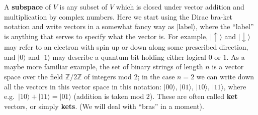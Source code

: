 \documentclass[fleqn]{article}
\begin{document}
A \textbf{subspace} of \(V\) is any subset of \(V\) which is closed under vector addition and multiplication by complex numbers.
Here we start using the Dirac bra-ket notation and write vectors in a somewhat fancy way as \(|\text{label}\rangle\), where the ``label'' is anything that serves to specify what the vector is.
For example, \(|\uparrow\rangle\) and \(|\downarrow\rangle\) may refer to an electron with spin up or down along some prescribed direction, and \(|0\rangle\) and \(|1\rangle\) may describe a quantum bit holding either logical \(0\) or \(1\).
As a maybe more familiar example, the set of binary strings of length \(n\) is a vector space over the field \(\mathbb{Z}/2\mathbb{Z}\) of integers mod \(2\); in the case \(n=2\) we can write down all the vectors in this vector space in this notation: \(|00\rangle\), \(|01\rangle\), \(|10\rangle\), \(|11\rangle\), where e.g.~\(|10\rangle+|11\rangle=|01\rangle\) (addition is taken mod \(2\)).
These are often called \textbf{ket} vectors, or simply \textbf{kets}.
(We will deal with ``bras'' in a moment).
\end{document}
